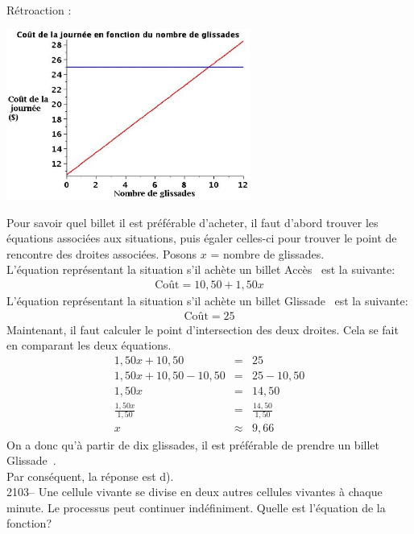 \documentclass[letterpaper, 12pt]{article}
\begin{document}
R\'etroaction :\\
\begin{center}
 \includegraphics[width=8cm,bb=14 14 589 415]{Q2102.eps}
\end{center}
Pour savoir quel billet il est pr\'ef\'erable d'acheter, il faut d'abord trouver les \'equations associ\'ees aux situations, puis \'egaler celles-ci pour trouver le point de rencontre des droites associ\'ees. Posons $x$ = nombre de glissades.\\
L'\'equation repr\'esentant la situation s'il ach\`ete un billet \og Acc\`es \fg\, est la suivante:
\begin{eqnarray*}
 \textrm{Co\^ut} = 10,50 + 1,50x
\end{eqnarray*}
L'\'equation repr\'esentant la situation s'il ach\`ete un billet \og Glissade \fg\, est la suivante:
\begin{eqnarray*}
 \textrm{Co\^ut} = 25
\end{eqnarray*}
Maintenant, il faut calculer le point d'intersection des deux droites. Cela se fait en comparant les deux \'equations.
\begin{eqnarray*}
 1,50x + 10,50 &=& 25 \\
 1,50x + 10,50 - 10,50 &=& 25 - 10,50 \\
 1,50x &=& 14,50 \\[2mm]
\frac{1,50x}{1,50} &=& \frac{14,50}{1,50}\\[2mm]
x &\approx& 9,66
\end{eqnarray*}
On a donc qu'\`a partir de dix glissades, il est pr\'ef\'erable de prendre un billet \og Glissade \fg\,.\\
Par cons\'equent, la r\'eponse est d).\\

2103-- Une cellule vivante se divise en deux autres cellules vivantes \`a chaque minute. Le processus peut continuer ind\'efiniment. Quelle est l'\'equation de la fonction?\\
\end{document}
